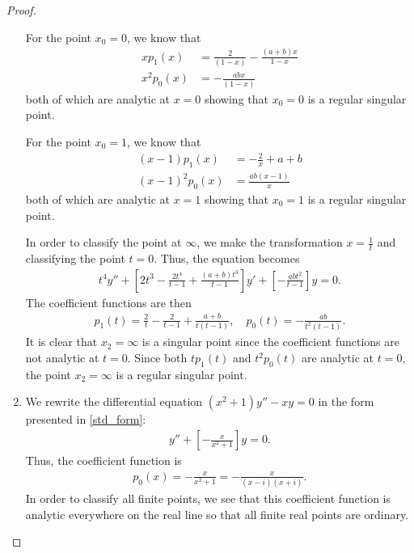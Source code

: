 \documentclass[12pt]{article}
\theoremstyle{definition}
\begin{document}
\begin{proof}
\begin{enumerate}
      For the point $x_0 = 0$, we know that
      \begin{align*}
        x p_1(x) &= \frac{2}{(1-x)} - \frac{(a+b)x}{1-x} \\
        x^2 p_0(x) &= -\frac{abx}{(1-x)}
      \end{align*}
      both of which are analytic at $x = 0$ showing that $x_0 = 0$ is a regular singular point.

      For the point $x_0 = 1$, we know that
      \begin{align*}
        (x-1)p_1(x) &= -\frac{2}{x} + a + b \\
        (x-1)^2 p_0(x) &= \frac{ab(x-1)}{x}
      \end{align*}
      both of which are analytic at $x = 1$ showing that $x_0 = 1$ is a regular singular point.

      In order to classify the point at $\infty$, we make the transformation $x=\frac{1}{t}$ and classifying the point $t=0$.
      Thus, the equation becomes
      \begin{align*}
        t^4 y'' + \left[2t^3 - \frac{2t^4}{t-1} + \frac{(a+b)t^3}{t-1}\right]y' + \left[-\frac{abt^2}{t-1}\right]y = 0.
      \end{align*}
      The coefficient functions are then
      \begin{align*}
        p_1(t) = \frac{2}{t} - \frac{2}{t-1} + \frac{a+b}{t(t-1)},\quad p_0(t) = -\frac{ab}{t^2(t-1)}.
      \end{align*}
      It is clear that $x_2 = \infty$ is a singular point since the coefficient functions are not analytic at $t=0$.
      Since both $tp_1(t)$ and $t^2p_0(t)$ are analytic at $t=0$, the point $x_2 = \infty$ is a regular singular point.
    \item We rewrite the differential equation $(x^2 + 1)y'' - xy = 0$ in the form presented in \eqref{std_form}:
      \begin{align*}
        y'' + \left[- \frac{x}{x^2+1}\right]y = 0.
      \end{align*}
      Thus, the coefficient function is
      \begin{align*}
        p_0(x) = -\frac{x}{x^2+1}=-\frac{x}{(x-i)(x+i)}.
      \end{align*}
      In order to classify all finite points, we see that this coefficient function is analytic everywhere
      on the real line so that all finite real points are ordinary.


\end{enumerate}
\end{proof}
\end{document}
